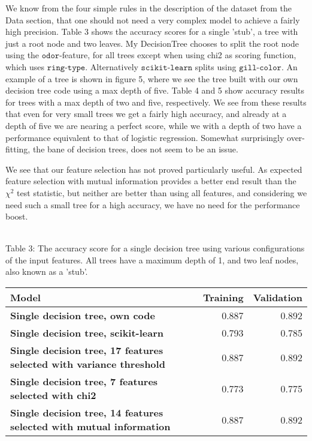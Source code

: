 \documentclass[11pt]{article}
\begin{document}
 We know from the four simple rules in the description of the dataset from the Data section, that one should not need a very complex model to achieve a fairly high precision. Table 3 shows the accuracy scores for a single 'stub', a tree with just a root node and two leaves. My DecisionTree chooses to split the root node using the $\texttt{odor}$-feature, for all trees except when using chi2 as scoring function, which uses $\texttt{ring-type}$. Alternatively $\texttt{scikit-learn}$ splits using $\texttt{gill-color}$. An example of a tree is shown in figure 5, where we see the tree built with our own decision tree code using a max depth of five. Table 4 and 5 show accuracy results for trees with a max depth of two and five, respectively. We see from these results that even for very small trees we get a fairly high accuracy, and already at a depth of five we are nearing a perfect score, while we with a depth of two have a performance equivalent to that of logistic regression. Somewhat surprisingly over-fitting, the bane of decision trees, does not seem to be an issue.

We see that our feature selection has not proved particularly useful. As expected feature selection with mutual information provides a better end result than the \(\chi^2\) test statistic, but neither are better than using all features, and considering we need such a small tree for a high accuracy, we have no need for the performance boost.

{ \hspace*{\fill} \\}
Table 3: The accuracy score for a single decision tree using various configurations of the input features. All trees have a maximum depth of 1, and two leaf nodes, also known as a 'stub'.
\begin{table}[h!]
	\begin{center}
		\label{tab:table1}
		\begin{tabular}{l|r|r}
        \textbf{Model}                                                      		   & \textbf{Training} & \textbf{Validation}
        \\ \hline
		\textbf{Single decision tree, own code}                                        & 0.887             & 0.892               \\ \hline
		\textbf{Single decision tree, scikit-learn}                                    & 0.793             & 0.785               \\ \hline
		\textbf{Single decision tree, 17 features selected with variance threshold}    & 0.887             & 0.892               \\ \hline
		\textbf{Single decision tree, 7 features selected with chi2}                   & 0.773             & 0.775               \\ \hline
		\textbf{Single decision tree, 14 features selected with mutual information}    & 0.887             & 0.892               \\ \hline
		\end{tabular}
	\end{center}
\end{table}
\end{document}
